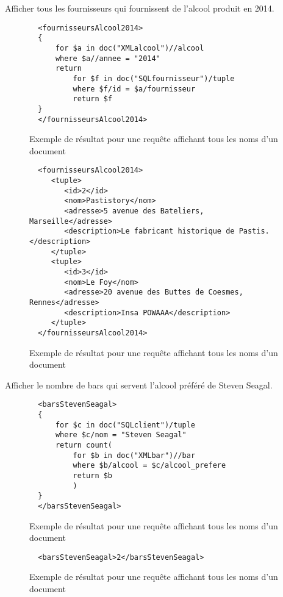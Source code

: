 \documentclass[a4paper,10pt]{article}
\begin{document}
Afficher tous les fournisseurs qui fournissent de l'alcool produit en 2014.

\begin{figure}[ht!]
\begin{verbatim}
  <fournisseursAlcool2014>
  {
      for $a in doc("XMLalcool")//alcool
      where $a//annee = "2014"
      return
          for $f in doc("SQLfournisseur")/tuple
          where $f/id = $a/fournisseur
          return $f	
  }
  </fournisseursAlcool2014>
\end{verbatim}
\caption{Exemple de résultat pour une requête affichant tous les noms d'un document}
\label{lst:requeteTest4}
\end{figure}

\begin{figure}[ht!]
\begin{verbatim}
  <fournisseursAlcool2014>
     <tuple>
        <id>2</id>
        <nom>Pastistory</nom>
        <adresse>5 avenue des Bateliers, Marseille</adresse>
        <description>Le fabricant historique de Pastis.</description>
     </tuple>
     <tuple>
        <id>3</id>
        <nom>Le Foy</nom>
        <adresse>20 avenue des Buttes de Coesmes, Rennes</adresse>
        <description>Insa POWAAA</description>
     </tuple>
  </fournisseursAlcool2014>
\end{verbatim}
\caption{Exemple de résultat pour une requête affichant tous les noms d'un document}
\label{lst:resultatTest4}
\end{figure}


Afficher le nombre de bars qui servent l'alcool préféré de Steven Seagal.

\begin{figure}[ht!]
\begin{verbatim}
  <barsStevenSeagal>
  {
      for $c in doc("SQLclient")/tuple
      where $c/nom = "Steven Seagal"
      return count(
          for $b in doc("XMLbar")//bar
          where $b/alcool = $c/alcool_prefere
          return $b
          )
  }
  </barsStevenSeagal>
\end{verbatim}
\caption{Exemple de résultat pour une requête affichant tous les noms d'un document}
\label{lst:requeteTest5}
\end{figure}

\begin{figure}[ht!]
\begin{verbatim}
  <barsStevenSeagal>2</barsStevenSeagal>
\end{verbatim}
\caption{Exemple de résultat pour une requête affichant tous les noms d'un document}
\label{lst:resultatTest5}
\end{figure}
\end{document}
